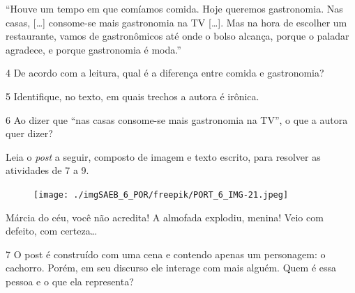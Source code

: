 \begin{myquote}
``Houve um tempo em que comíamos comida. Hoje queremos gastronomia. Nas
casas, {[}\ldots{]} consome-se mais gastronomia na TV {[}\ldots{]}. Mas
na hora de escolher um restaurante, vamos de gastronômicos até onde o
bolso alcança, porque o paladar agradece, e porque gastronomia é moda.''

\end{myquote}

\num{4} De acordo com a leitura, qual é a diferença entre comida e
gastronomia?


\num{5} Identifique, no texto, em quais trechos a autora é irônica.


\num{6} Ao dizer que ``nas casas consome-se mais gastronomia na TV'', o
que a autora quer dizer?


Leia o \textit{post} a seguir, composto de imagem e texto escrito, para resolver
as atividades de 7 a 9.

\begin{myquote}
\begin{figure}[H]
\centering\texttt{[image: ./imgSAEB\_6\_POR/freepik/PORT\_6\_IMG-21.jpeg]}
\end{figure}

Márcia do céu, você não acredita! A almofada explodiu, menina! Veio com
defeito, com certeza\ldots{}
\end{myquote}

\num{7} O post é construído com uma cena e contendo apenas um
personagem: o cachorro. Porém, em seu discurso ele interage com mais
alguém. Quem é essa pessoa e o que ela representa?

